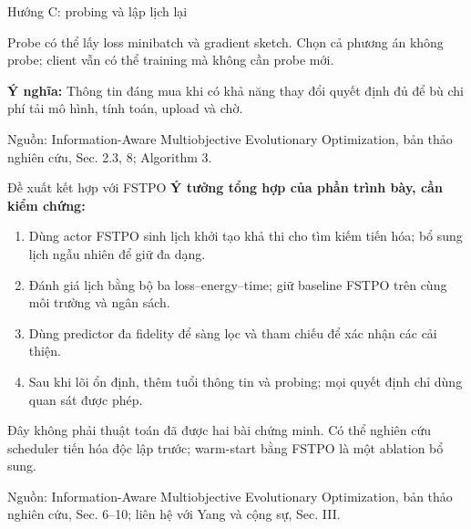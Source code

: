 \documentclass[10pt,aspectratio=43]{beamer}
\newcommand{\source}[1]{\par\vfill{\fontsize{5.8}{7}\selectfont\color{Muted}Nguồn: #1\par}}
\newcommand{\eqmeaning}[1]{\par\medskip\textcolor{HustRed}{\textbf{Ý nghĩa:}} #1\par}
\newcommand{\noteonly}[1]{\par{\footnotesize\color{Muted}#1\par}}
\begin{document}
\begin{frame}[t]{Hướng C: probing và lập lịch lại}\relax
\small
\begin{center}\end{center}
Probe có thể lấy loss minibatch và gradient sketch. Chọn cả phương án không probe; client vẫn có thể training mà không cần probe mới.
\eqmeaning{Thông tin đáng mua khi có khả năng thay đổi quyết định đủ để bù chi phí tải mô hình, tính toán, upload và chờ.}
\source{Information-Aware Multiobjective Evolutionary Optimization, bản thảo nghiên cứu, Sec. 2.3, 8; Algorithm 3.}
\end{frame}

\begin{frame}[t]{Đề xuất kết hợp với FSTPO}\relax
\small
\textbf{Ý tưởng tổng hợp của phần trình bày, cần kiểm chứng:}
\begin{enumerate}\item Dùng actor FSTPO sinh lịch khởi tạo khả thi cho tìm kiếm tiến hóa; bổ sung lịch ngẫu nhiên để giữ đa dạng.
\item Đánh giá lịch bằng bộ ba loss--energy--time; giữ baseline FSTPO trên cùng môi trường và ngân sách.
\item Dùng predictor đa fidelity để sàng lọc và tham chiếu để xác nhận các cải thiện.
\item Sau khi lõi ổn định, thêm tuổi thông tin và probing; mọi quyết định chỉ dùng quan sát được phép.
\end{enumerate}
\noteonly{Đây không phải thuật toán đã được hai bài chứng minh. Có thể nghiên cứu scheduler tiến hóa độc lập trước; warm-start bằng FSTPO là một ablation bổ sung.}
\source{Information-Aware Multiobjective Evolutionary Optimization, bản thảo nghiên cứu, Sec. 6--10; liên hệ với Yang và cộng sự, Sec. III.}
\end{frame}
\end{document}
